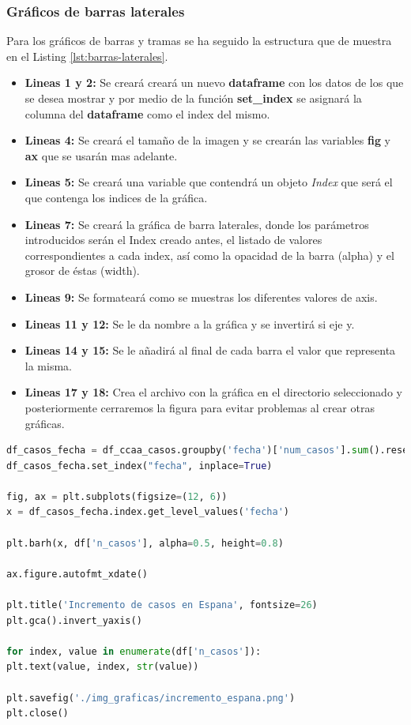 \subsubsection{Gráficos de barras laterales}

Para los gráficos de barras y tramas se ha seguido la estructura que de muestra en el Listing \ref{lst:barras-laterales}. 

\begin{itemize}
	\item \textbf{Lineas 1 y 2:} Se creará creará un nuevo \textbf{dataframe} con los datos de los que se desea mostrar y por medio de la función \textbf{set\_index} se asignará la columna del \textbf{dataframe} como el index del mismo.
	\item \textbf{Lineas 4:} Se creará el tamaño de la imagen y se crearán las variables \textbf{fig} y \textbf{ax} que se usarán mas adelante.
	\item \textbf{Lineas 5:} Se creará una variable que contendrá un objeto \textit{Index} que será el que contenga los indices de la gráfica.
	\item \textbf{Lineas 7:} Se creará la gráfica de barra laterales, donde los parámetros introducidos serán el Index creado antes, el listado de valores correspondientes a cada index, así como la opacidad de la barra (alpha) y el grosor de éstas (width).
	\item \textbf{Lineas 9:} Se formateará como se muestras los diferentes valores de axis.
	\item \textbf{Lineas 11 y 12:} Se le da nombre a la gráfica y se invertirá si eje y.
	\item \textbf{Lineas 14 y 15:} Se le añadirá al final de cada barra el valor que representa la misma.
	\item \textbf{Lineas 17 y 18:} Crea el archivo con la gráfica en el directorio seleccionado y posteriormente cerraremos la figura para evitar problemas al crear otras gráficas.
\end{itemize}

\begin{lstlisting}[language=Python, caption={Generár gráficos de barras laterales.}, label={lst:barras-laterales}]
df_casos_fecha = df_ccaa_casos.groupby('fecha')['num_casos'].sum().reset_index()
df_casos_fecha.set_index("fecha", inplace=True)

fig, ax = plt.subplots(figsize=(12, 6))
x = df_casos_fecha.index.get_level_values('fecha')

plt.barh(x, df['n_casos'], alpha=0.5, height=0.8)

ax.figure.autofmt_xdate()

plt.title('Incremento de casos en Espana', fontsize=26)
plt.gca().invert_yaxis()

for index, value in enumerate(df['n_casos']):
plt.text(value, index, str(value))

plt.savefig('./img_graficas/incremento_espana.png')
plt.close()
\end{lstlisting}

